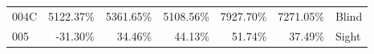 \begin{table}[!htb]
\begin{tabular}{lrrrrrl}
004C        &  5122.37\% &  5361.65\% &                                             5108.56\% &                                              7927.70\% &  7271.05\% &                                                      Blind \\
005         &   -31.30\% &    34.46\% &                                               44.13\% &                                                51.74\% &    37.49\% &                                                      Sight \\
\bottomrule
\end{tabular}
\end{table}

